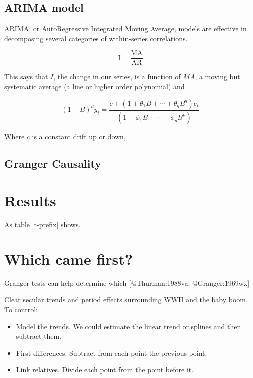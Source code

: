 \documentclass [PhD] {uclathes}
\providecommand{\tightlist}{
  \setlength{\itemsep}{0pt}\setlength{\parskip}{0pt}}
\begin{document}
\subsection{ARIMA model}\label{arima-model}

ARIMA, or AutoRegressive Integrated Moving Average, models are effective
in decomposing several categories of within-series correlations.

\begin{equation}
\text{I} = \frac{\text{MA}}{\text{AR}}
\end{equation}

This says that \(I\), the change in our series, is a function of \(MA\),
a moving but systematic average (a line or higher order polynomial) and

\begin{equation}
 (1-B)^d y_{t} = \frac{c + (1 + \theta_1 B + \cdots + \theta_q B^q)e_t}{(1-\phi_1B - \cdots - \phi_p B^p)}
\end{equation}

Where \(c\) is a constant drift up or down,

\subsection{Granger Causality}\label{granger-causality}

\section{Results}\label{results}

As table \ref{t-prefix} shows.

\section{Which came first?}\label{which-came-first}

Granger tests can help determine which {[}@Thurman:1988va;
@Granger:1969wx{]}

Clear secular trends and period effects surrounding WWII and the baby
boom. To control:

\begin{itemize}
\tightlist
\item
  Model the trends. We could estimate the linear trend or splines and
  then subtract them.
\item
  First differences. Subtract from each point the previous point.
\item
  Link relatives. Divide each point from the point before it.
\end{itemize}
\end{document}
